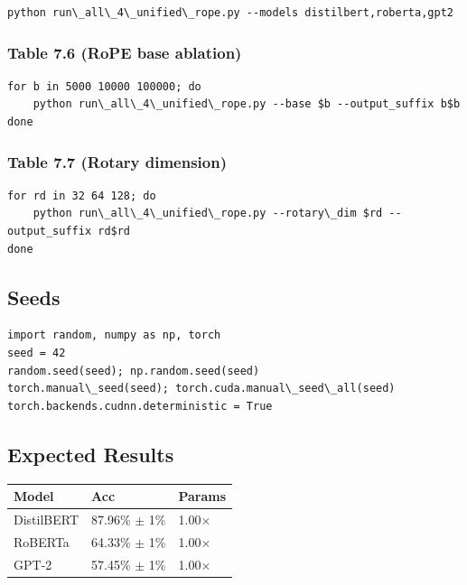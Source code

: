 \begin{lstlisting}
python run\_all\_4\_unified\_rope.py --models distilbert,roberta,gpt2
\end{lstlisting}

\subsubsection{Table 7.6 (RoPE base ablation)}

\begin{lstlisting}
for b in 5000 10000 100000; do
    python run\_all\_4\_unified\_rope.py --base $b --output_suffix b$b
done
\end{lstlisting}

\subsubsection{Table 7.7 (Rotary dimension)}

\begin{lstlisting}
for rd in 32 64 128; do
    python run\_all\_4\_unified\_rope.py --rotary\_dim $rd --output_suffix rd$rd
done
\end{lstlisting}

\subsection{Seeds}

\begin{lstlisting}
import random, numpy as np, torch
seed = 42
random.seed(seed); np.random.seed(seed)
torch.manual\_seed(seed); torch.cuda.manual\_seed\_all(seed)
torch.backends.cudnn.deterministic = True
\end{lstlisting}

\subsection{Expected Results}

\begin{table}[H]
\centering
\small
\begin{tabular}{lll}
\toprule
\textbf{Model} & \textbf{Acc} & \textbf{Params} \\
\midrule
DistilBERT & 87.96\% $\pm$ 1\% & 1.00$\times$ \\
RoBERTa & 64.33\% $\pm$ 1\% & 1.00$\times$ \\
GPT-2 & 57.45\% $\pm$ 1\% & 1.00$\times$ \\
\bottomrule
\end{tabular}
\end{table}

